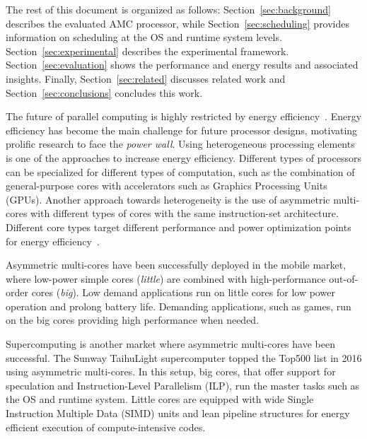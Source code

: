 
The rest of this document is organized as follows: Section~\ref{sec:background} describes the evaluated AMC processor, while Section~\ref{sec:scheduling} provides information on 
scheduling at the OS and runtime system levels. 
Section~\ref{sec:experimental} describes the experimental framework. 
Section~\ref{sec:evaluation} shows the performance and energy results and associated insights.%
Finally, Section~\ref{sec:related} discusses related work and Section~\ref{sec:conclusions} concludes this work. 

\iffalse

The future of parallel computing is highly restricted by energy 
efficiency~\cite{Kogge_Exascale_TR08}. Energy efficiency has become the main 
challenge for future processor designs, motivating prolific research to face the 
\emph{power wall}. Using heterogeneous processing elements is one of the 
approaches to increase energy efficiency. Different types of processors can 
be specialized for different types of computation, such as the combination of 
general-purpose cores with accelerators such as Graphics Processing Units (GPUs). 
Another approach towards heterogeneity is the use of asymmetric multi-cores 
with different types of cores with the same instruction-set architecture. Different core types 
target different performance and power optimization points for energy
efficiency~\cite{Kumar:ISCA2004,Balakrishnan:ISCA2005}. 

Asymmetric multi-cores have been successfully deployed in the mobile market, where 
low-power simple cores (\emph{little}) are combined with 
high-performance out-of-order cores (\emph{big}). Low demand applications
run on little cores for low power operation and prolong battery life. Demanding
applications, such as games, run on the big cores providing high performance
when needed.

Supercomputing is another market where asymmetric multi-cores have been successful. 
The Sunway TaihuLight supercomputer topped the Top500 list in 2016 using asymmetric multi-cores. 
In this setup, big cores, that offer support for speculation and Instruction-Level Parallelism (ILP), run the master tasks such as the OS and runtime system.
Little cores are equipped with wide Single Instruction Multiple Data (SIMD) units and lean pipeline structures for energy efficient execution of compute-intensive codes. 


